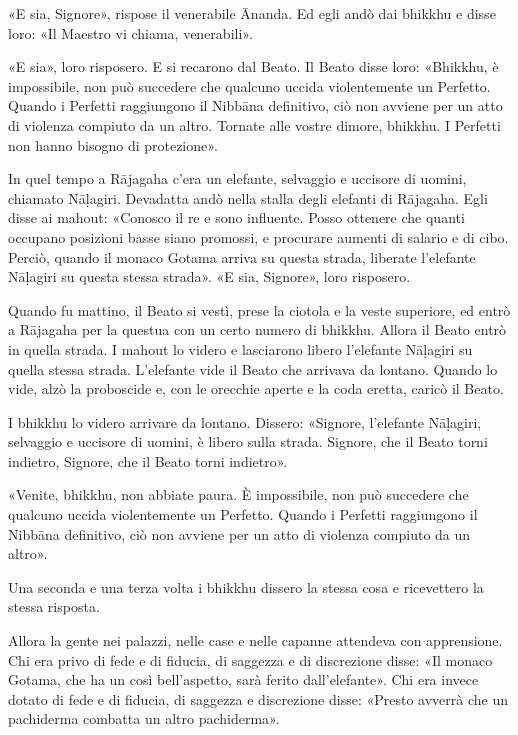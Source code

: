«E sia, Signore», rispose il venerabile Ānanda. Ed egli andò dai bhikkhu
e disse loro: «Il Maestro vi chiama, venerabili».


«E sia», loro risposero. E si recarono dal Beato. Il Beato disse loro:
«Bhikkhu, è impossibile, non può succedere che qualcuno uccida
violentemente un Perfetto. Quando i Perfetti raggiungono il Nibbāna
definitivo, ciò non avviene per un atto di violenza compiuto da un
altro. Tornate alle vostre dimore, bhikkhu. I Perfetti non hanno bisogno
di protezione».


In quel tempo a Rājagaha c’era un elefante, selvaggio e uccisore di
uomini, chiamato Nāḷagiri. Devadatta andò nella stalla degli elefanti di
Rājagaha. Egli disse ai mahout: «Conosco il re e sono influente. Posso
ottenere che quanti occupano posizioni basse siano promossi, e procurare
aumenti di salario e di cibo. Perciò, quando il monaco Gotama arriva su
questa strada, liberate l’elefante Nāḷagiri su questa stessa strada». «E
sia, Signore», loro risposero.


Quando fu mattino, il Beato si vestì, prese la ciotola e la veste
superiore, ed entrò a Rājagaha per la questua con un certo numero di
bhikkhu. Allora il Beato entrò in quella strada. I mahout lo videro e
lasciarono libero l’elefante Nāḷagiri su quella stessa strada.
L’elefante vide il Beato che arrivava da lontano. Quando lo vide, alzò
la proboscide e, con le orecchie aperte e la coda eretta, caricò il
Beato.


I bhikkhu lo videro arrivare da lontano. Dissero: «Signore, l’elefante
Nāḷagiri, selvaggio e uccisore di uomini, è libero sulla strada.
Signore, che il Beato torni indietro, Signore, che il Beato torni
indietro».


«Venite, bhikkhu, non abbiate paura. È impossibile, non può succedere
che qualcuno uccida violentemente un Perfetto. Quando i Perfetti
raggiungono il Nibbāna definitivo, ciò non avviene per un atto di
violenza compiuto da un altro».


Una seconda e una terza volta i bhikkhu dissero la stessa cosa e
ricevettero la stessa risposta.


Allora la gente nei palazzi, nelle case e nelle capanne attendeva con
apprensione. Chi era privo di fede e di fiducia, di saggezza e di
discrezione disse: «Il monaco Gotama, che ha un così bell’aspetto, sarà
ferito dall’elefante». Chi era invece dotato di fede e di fiducia, di
saggezza e discrezione disse: «Presto avverrà che un pachiderma combatta
un altro pachiderma».


